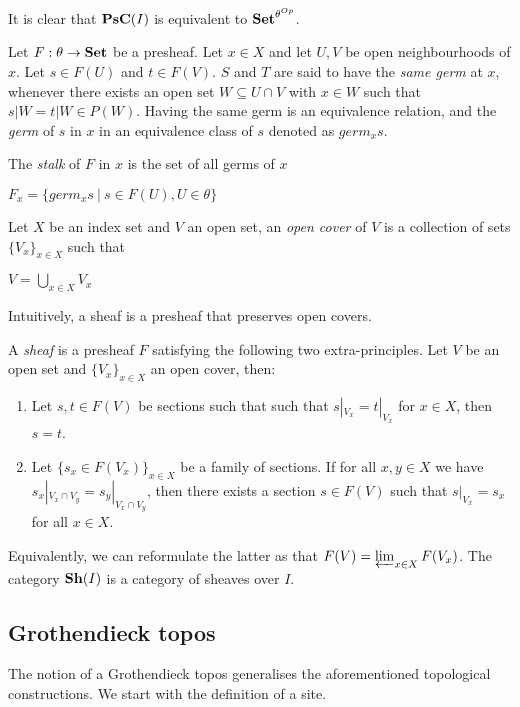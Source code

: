\documentclass[a4paper]{article}
\theoremstyle{defin}
\theoremstyle{theorem}
\theoremstyle{claim}
\theoremstyle{prop}
\theoremstyle{lemma}
\theoremstyle{fact}
\theoremstyle{ex}
\theoremstyle{col}
\begin{document}

It is clear that ${\bf PsC}(I)$ is equivalent to ${\bf Set}^{\theta^{Op}}$.

Let $F : \theta \to {\bf Set}$ be a presheaf. Let $x \in X$ and let $U, V$ be open neighbourhoods of $x$.
Let $s \in F(U)$ and $t \in F(V)$. $S$ and $T$ are said to have the \emph{same germ} at $x$, whenever there exists an open set $W \subseteq U \cap V$ with $x \in W$ such that $s|W = t|W \in P(W)$. Having the same germ is an equivalence relation, and the \emph{germ} of $s$ in $x$ in an equivalence class of $s$ denoted as $germ_x s$.

The \emph{stalk} of $F$ in $x$ is the set of all germs of $x$
\begin{center}
$F_x = \{ germ_x s \: | \: s \in F(U), U \in \theta \}$
\end{center}

Let $X$ be an index set and $V$ an open set, an \emph{open cover} of $V$ is a collection of sets $\{ V_x\}_{x \in X}$ such that
\begin{center}
$V = \bigcup \limits_{x \in X} V_x$
\end{center}

Intuitively, a sheaf is a presheaf that preserves open covers.

A \emph{sheaf} is a presheaf $F$ satisfying the following two extra-principles. Let $V$ be an open set and $\{V_x
\}_{x \in X}$ an open cover, then:
\begin{enumerate}
\item Let $s, t \in F(V)$ be sections such that such that $s|_{V_x} = t|_{V_x}$ for $x \in X$, then $s = t$.
\item Let $\{ s_x \in F(V_x) \}_{x \in X}$ be a family of sections. If for all $x, y \in X$ we have $s_x|_{V_x \cap V_y} = s_y|_{V_x \cap V_y}$, then there exists a section $s \in F(V)$ such that $s|_{V_x} = s_x$ for all $x \in X$.
\end{enumerate}
Equivalently, we can reformulate the latter as that $F(V) = \varprojlim_{x \in X} F(V_x)$.
The category ${\bf Sh}(I)$ is a category of sheaves over $I$.

\subsection{Grothendieck topos}

The notion of a Grothendieck topos generalises the aforementioned topological constructions. We start with the definition of a site.
\end{document}
